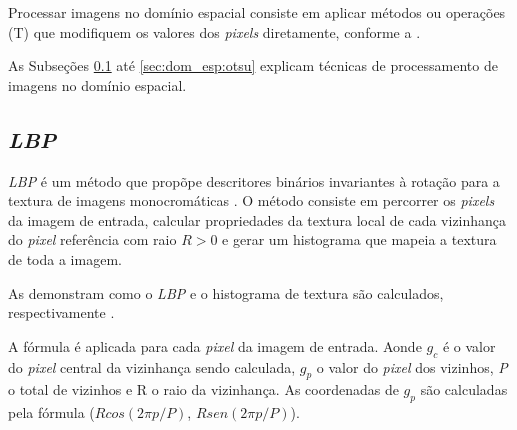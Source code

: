 
\par Processar imagens no domínio espacial consiste em aplicar métodos ou operações (T) que modifiquem os valores dos \textit{pixels} diretamente, conforme a  \cite{gonsalez2006}.


\par As Subseções \ref{sec:dom_esp:lbp} até \ref{sec:dom_esp:otsu} explicam técnicas de processamento de imagens no domínio espacial.

\subsection{\textit{\acrfull{LBP}}}\label{sec:dom_esp:lbp}

\par \textit{\acrshort{LBP}} é um método que propõpe descritores binários invariantes à rotação para a textura de imagens monocromáticas \cite{ojala2002LBP}. O método consiste em percorrer os \textit{pixels} da imagem de entrada, calcular propriedades da textura local de cada vizinhança do \textit{pixel} referência com raio $R > 0$ e gerar um histograma que mapeia a textura de toda a imagem.

\par As  demonstram como o \textit{\acrshort{LBP}} e o histograma de textura são calculados, respectivamente \cite{ojala2002LBP}\cite{guo2010-CLBP}.

       
\par A fórmula é aplicada para cada \textit{pixel} da imagem de entrada. Aonde $g_{c}$ é o valor do \textit{pixel} central da vizinhança sendo calculada, $g_{p}$ o valor do \textit{pixel} dos vizinhos, \textit{P} o total de vizinhos e R o raio da vizinhança. As coordenadas de $g_{p}$ são calculadas pela fórmula ($Rcos(2 \pi p/P)$, $Rsen(2 \pi p/P)$). 

